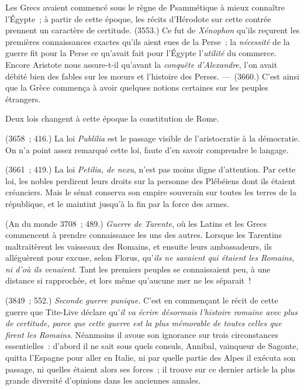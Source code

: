 \documentclass[french,twoside]{book} %
\begin{document}
Les Grecs avaient commencé sous le règne de Psammétique à mieux connaître l’Égypte ; à partir de cette époque, les récits d’Hérodote sur cette contrée prennent un caractère de certitude. (3553.) Ce fut de {\itshape Xénophon} qu’ils reçurent les premières connaissances exactes qu’ils aient eues de la Perse ; la {\itshape nécessité} de la guerre fit pour la Perse ce qu’avait fait pour l’Égypte l’{\itshape utilité} du commerce. Encore Aristote nous assure-t-il qu’avant la {\itshape conquête d’Alexandre}, l’on avait débité bien des fables sur les mœurs et l’histoire des Perses. — (3660.) C’est ainsi que la Grèce commença à avoir quelques notions certaines sur les peuples étrangers.\par
Deux lois changent à cette époque la constitution de Rome.\par
(3658 ; 416.) La loi {\itshape Publilia} est le passage visible de l’aristocratie à la démocratie. On n’a point assez remarqué cette loi, faute d’en savoir comprendre le langage.\par
(3661 ; 419.) La loi {\itshape Petilia, de nexu}, n’est pas moins digne d’attention. Par cette loi, les nobles perdirent leurs droits sur la personne des Plébéiens dont ils étaient  créanciers. Mais le sénat conserva son empire souverain sur toutes les terres de la république, et le maintint jusqu’à la fin par la force des armes.\par
(An du monde 3708 ; 489.) {\itshape Guerre de Tarente}, où les Latins et les Grecs commencent à prendre connaissance les uns des autres. Lorsque les Tarentins maltraitèrent les vaisseaux des Romains, et ensuite leurs ambassadeurs, ils alléguèrent pour excuse, selon Florus, qu’\emph{{\itshape ils ne savaient qui étaient les Romains, ni d’où ils venaient}}. Tant les premiers peuples se connaissaient peu, à une distance si rapprochée, et lors même qu’aucune mer ne les séparait !\par
(3849 ; 552.) {\itshape Seconde guerre punique.} C’est en commençant le récit de cette guerre que Tite-Live déclare qu’\emph{{\itshape il va écrire désormais l’histoire romaine avec plus de certitude, parce que cette guerre est la plus mémorable de toutes celles que firent les Romains}}. Néanmoins il avoue son ignorance sur trois circonstances essentielles : d’abord il ne sait sous quels consuls, Annibal, vainqueur de Sagonte, quitta l’Espagne pour aller en Italie, ni par quelle partie des Alpes il exécuta son passage, ni quelles étaient alors ses forces ; il trouve sur ce dernier article la plus grande diversité d’opinions dans les anciennes annales.\par
\end{document}
